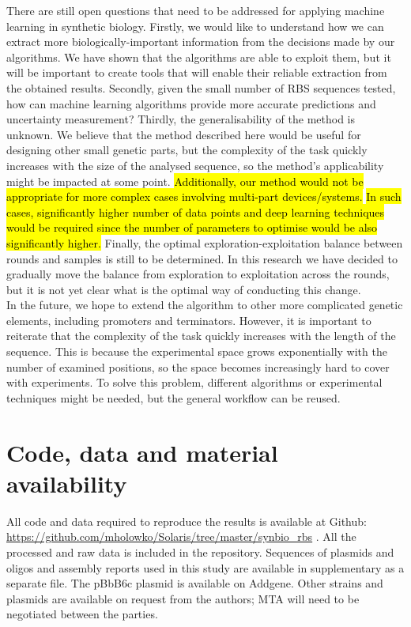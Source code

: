 \documentclass{article}
\begin{document}
There are still open questions that need to be addressed for applying machine learning in synthetic biology.
Firstly, we would like to understand how we can extract more biologically-important information from the decisions made by our algorithms.
We have shown that the algorithms are able to exploit them, but it will be important to create tools that will enable their reliable extraction from the obtained results.
Secondly, given the small number of RBS sequences tested, how can machine learning algorithms provide more accurate predictions and uncertainty measurement? 
Thirdly, the generalisability of the method is unknown.
We believe that the method described here would be useful for designing other small genetic parts, but the complexity of the task quickly increases with the size of the analysed sequence, so the method's applicability might be impacted at some point.
\hl{Additionally, our method would not be appropriate for more complex cases involving multi-part devices/systems.}
\hl{In such cases, significantly higher number of data points and deep learning techniques would be required since the number of parameters to optimise would be also significantly higher.}
Finally, the optimal exploration-exploitation balance between rounds and samples is still to be determined.
In this research we have decided to gradually move the balance from exploration to exploitation across the rounds, but it is not yet clear what is the optimal way of conducting this change.\\

In the future, we hope to extend the algorithm to other more complicated genetic elements, including promoters and terminators.
However, it is important to reiterate that the complexity of the task quickly increases with the length of the sequence.
This is because the experimental space grows exponentially with the number of examined positions, so the space becomes increasingly hard to cover with experiments.
To solve this problem, different algorithms or experimental techniques might be needed, but the general workflow can be reused.\\


\section*{Code, data and material availability}

All code and data required to reproduce the results is available at Github: \url{https://github.com/mholowko/Solaris/tree/master/synbio_rbs} .
All the processed and raw data is included in the repository.
Sequences of plasmids and oligos and assembly reports used in this study are available in supplementary as a separate file.
The pBbB6c plasmid is available on Addgene. Other strains and plasmids are available on request from the authors; MTA will need to be negotiated between the parties.
\end{document}

